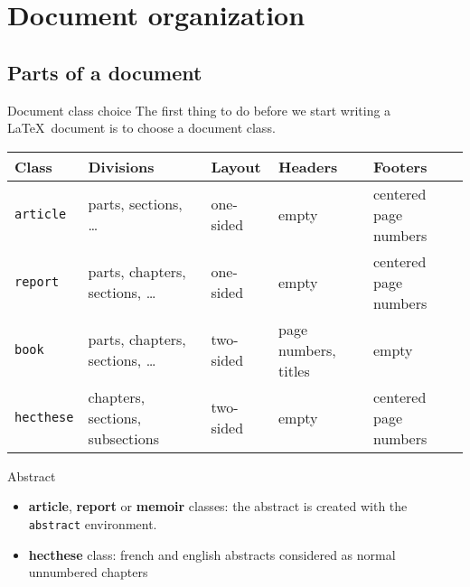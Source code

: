 
\section{Document organization}

\subsection{Parts of a document}

\begin{frame}[c]{Document class choice}
	The first thing to do before we start writing a \LaTeX\ document is to choose
	a document class.
	
	\begin{table}[c]
		\begin{tabularx}{\textwidth}{lllll}
			\arrayrulecolor{grisPrimaire!40}\hline\hline
			\textbf{Class} & \textbf{Divisions} & \textbf{Layout} & \textbf{Headers} &	\textbf{Footers} \\
			\hline
			\texttt{article}			&	parts, sections, \ldots					&	one-sided	&	empty			&	centered page numbers\\
			\texttt{report}				&	parts, chapters, sections, \ldots		&	one-sided	&	empty			&	centered page numbers\\
			\texttt{book}				&	parts, chapters, sections, \ldots		&	two-sided	& 	page numbers, titles	&	empty \\
			\texttt{hecthese}			&	chapters, sections, subsections			&	two-sided	&	empty			&	centered page numbers \\
			\hline\hline
		\end{tabularx}
	\end{table}
\end{frame}

\begin{frame}[fragile,c]{Abstract}
	\begin{itemize}
		\item \textbf{article}, \textbf{report} or \textbf{memoir} classes: the abstract is created with
		the \lstinline|abstract| environment.
\begin{codesource}
	\begin{abstract}
		...
	\end{abstract}
\end{codesource}

		\item \textbf{hecthese} class: french and english abstracts considered as normal unnumbered
			chapters
	\end{itemize}
\end{frame}

